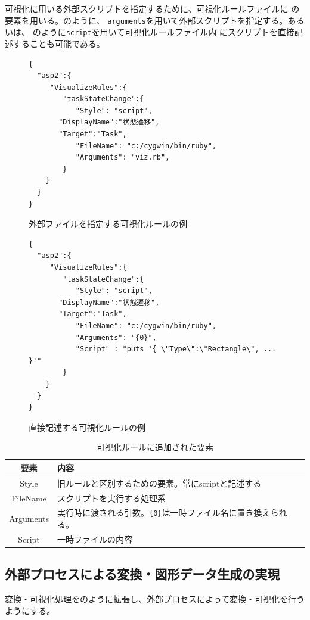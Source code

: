 可視化に用いる外部スクリプトを指定するために、可視化ルールファイルに
の要素を用いる。のように、
\verb!arguments!を用いて外部スクリプトを指定する。あるいは、
のように\verb!script!を用いて可視化ルールファイル内
にスクリプトを直接記述することも可能である。

\begin{figure}
\begin{lstlisting}
{
  "asp2":{
     "VisualizeRules":{
        "taskStateChange":{
           "Style": "script",
	   "DisplayName":"状態遷移",
   	   "Target":"Task",
           "FileName": "c:/cygwin/bin/ruby",
           "Arguments": "viz.rb",
        }
    }
  }
}
\end{lstlisting}
\caption{外部ファイルを指定する可視化ルールの例}\label{outside-viz}
\end{figure}


\begin{figure}
\begin{lstlisting}
{
  "asp2":{
     "VisualizeRules":{
        "taskStateChange":{
           "Style": "script",
	   "DisplayName":"状態遷移",
   	   "Target":"Task",
           "FileName": "c:/cygwin/bin/ruby",
           "Arguments": "{0}",
           "Script" : "puts '{ \"Type\":\"Rectangle\", ... }'"
        }
    }
  }
}
\end{lstlisting}
\caption{直接記述する可視化ルールの例}\label{inline-viz}
\end{figure}

\begin{table}[hb]
\centering
\caption{可視化ルールに追加された要素}\label{viz}
\begin{tabular}{|c|l|}
\hline
要素 & 内容  \\\hline
Style & 旧ルールと区別するための要素。常にscriptと記述する \\
FileName  & スクリプトを実行する処理系 \\
Arguments & 実行時に渡される引数。\verb!{0}!は一時ファイル名に置き換えられる。\\
Script    & 一時ファイルの内容 \\
\hline
\end{tabular}
\end{table}

\subsection{外部プロセスによる変換・図形データ生成の実現}
変換・可視化処理をのように拡張し、外部プロセスによって変換・可視化を行うようにする。

